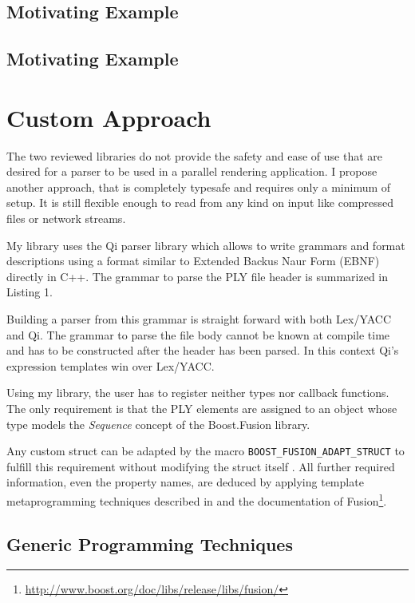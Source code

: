 \documentclass[a4paper, parskip=half, twocolumn]{scrartcl}
\begin{document}
\subsection{Motivating Example}



\subsection{Motivating Example}





\section{Custom Approach}

The two reviewed libraries do not provide the safety and ease of use that are
desired for a parser to be used in a parallel rendering application. I propose
another approach, that is completely typesafe and requires only a minimum of
setup. It is still flexible enough to read from any kind on input like
compressed files or network streams.

My library uses the Qi parser library which allows to write grammars and format
descriptions using a format similar to Extended Backus Naur Form (EBNF) directly
in C++. The grammar to parse the PLY file header is summarized in Listing 1.


Building a parser from this grammar is straight forward with both Lex/YACC and
Qi. The grammar to parse the file body cannot be known at compile time and has
to be constructed after the header has been parsed. In this context Qi's
expression templates win over Lex/YACC.

Using my library, the user has to register neither types nor callback functions.
The only requirement is that the PLY elements are assigned to an object whose
type models the \emph{Sequence} concept of the Boost.Fusion library.

Any custom struct can be adapted by the macro
\texttt{BOOST\_FUSION\_ADAPT\_STRUCT} to fulfill this requirement without
modifying the struct itself . All further required information, even the
property names, are deduced by applying template metaprogramming techniques
described in \cite{Abrahams:2004:CTM:1044941} and the documentation of
Fusion\footnote{\url{http://www.boost.org/doc/libs/release/libs/fusion/}}.

\subsection{Generic Programming Techniques}
\end{document}
